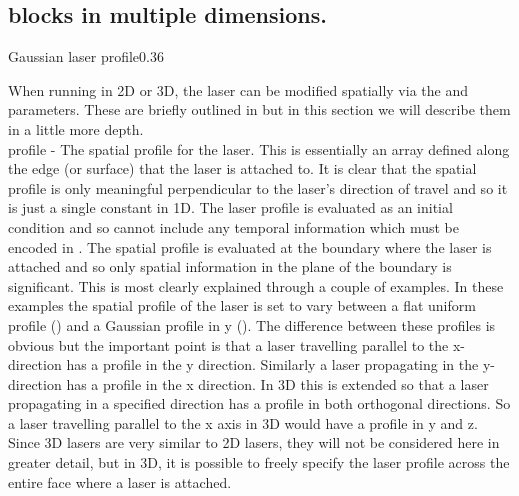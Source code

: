 \subsection{ blocks in multiple dimensions.}
\label{sec:multilaser}

    {Gaussian laser profile}{0.36}

When running {\EPOCH} in 2D or 3D, the laser can be modified spatially
via the  and  parameters. These
are briefly outlined in  but in this section we will describe
them in a little more depth.\\

{\emphtext profile} - The spatial profile for the laser. This is
essentially an array defined along the edge (or surface) that the laser is
attached to. It is clear that the spatial profile is only meaningful
perpendicular to the laser's direction of travel and so it is just a single
constant in 1D. The laser profile is evaluated as an initial condition
and so cannot include any temporal information which must be
encoded in .  The spatial profile is evaluated at the
boundary where the laser is attached and so only spatial information in the
plane of the boundary is significant. This is most clearly explained through a
couple of examples. In these examples the spatial profile of the laser is set
to vary between a flat uniform profile () and a
Gaussian profile in y (). The
difference between these profiles is obvious but the important point is that a
laser travelling parallel to the x-direction has a profile in the y
direction. Similarly a laser propagating in the y-direction has a profile in
the x direction. In 3D this is extended so that a laser propagating in a
specified direction has a profile in both orthogonal directions. So a laser
travelling parallel to the x axis in 3D would have a profile in y and z. Since
3D lasers are very similar to 2D lasers, they will not be considered here in
greater detail, but in 3D, it is possible to freely specify the laser profile
across the entire face where a laser is attached.\\


